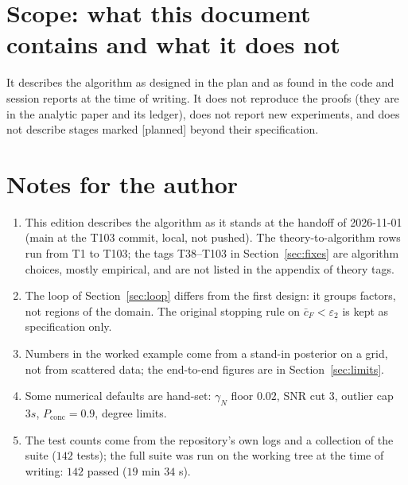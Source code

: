 \documentclass[11pt,a4paper]{article}
\theoremstyle{definition}
\newcommand{\badge}[2]{\textcolor{#1}{\textsf{\footnotesize[#2]}}}
\newcommand{\plan}{\badge{cB}{planned}}
\begin{document}
\section{Scope: what this document contains and what it does not}\label{app:scope}
It describes the algorithm as designed in the plan and as found in the code and session reports at the time of writing. It does not reproduce the proofs (they are in the analytic paper and its ledger), does not report new experiments, and does not describe stages marked \plan{} beyond their specification.

\section{Notes for the author}\label{app:ednotes}
\begin{enumerate}[nosep]
\item This edition describes the algorithm as it stands at the handoff of 2026-11-01 (main at the T103 commit, local, not pushed). The theory-to-algorithm rows run from T1 to T103; the tags T38--T103 in Section~\ref{sec:fixes} are algorithm choices, mostly empirical, and are not listed in the appendix of theory tags.
\item The loop of Section~\ref{sec:loop} differs from the first design: it groups factors, not regions of the domain. The original stopping rule on $\bar c_F<\varepsilon_2$ is kept as specification only.
\item Numbers in the worked example come from a stand-in posterior on a grid, not from scattered data; the end-to-end figures are in Section~\ref{sec:limits}.
\item Some numerical defaults are hand-set: $\gamma_N$ floor $0.02$, SNR cut $3$, outlier cap $3s$, $P_{\mathrm{conc}}=0.9$, degree limits.
\item The test counts come from the repository's own logs and a collection of the suite ($142$ tests); the full suite was run on the working tree at the time of writing: $142$ passed ($19$ min $34$ s).
\end{enumerate}
\end{document}
